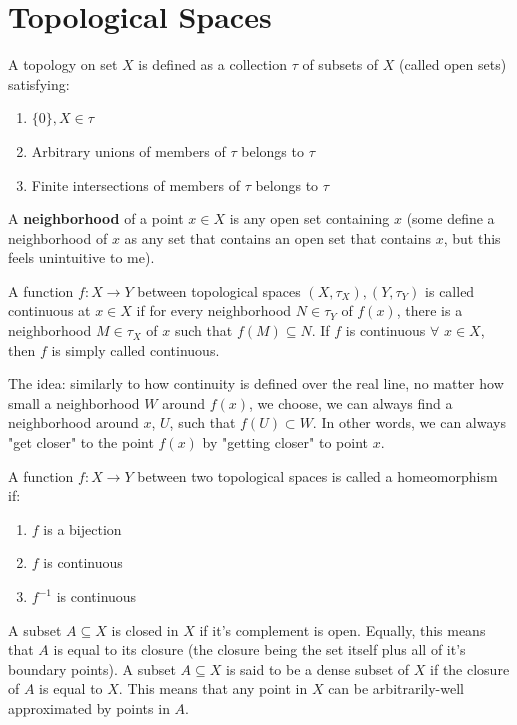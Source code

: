 \chapter{Topological Spaces}
\begin{definition}
	A topology on set $X$ is defined as a collection $\tau$ of subsets of $X$ (called open sets) satisfying:
	\begin{enumerate}
		\item $\{0\}, X\in \tau$
		\item Arbitrary unions of members of $\tau$ belongs to $\tau$
		\item Finite intersections of members of $\tau$ belongs to $\tau$
	\end{enumerate}
\end{definition}
A \textbf{neighborhood} of a point $x\in X$ is any open set containing $x$ (some define a neighborhood of $x$ as any set that contains an open set that contains $x$, but this feels unintuitive to me).
\begin{definition}
	A function $f: X\rightarrow Y$ between topological spaces $(X,\tau_X), (Y,\tau_Y)$ is called continuous at $x\in X$ if for every neighborhood $N\in \tau_Y$ of $f(x)$, there is a neighborhood $M\in \tau_X$ of $x$ such that $f(M)\subseteq N$. If $f$ is continuous $\forall$ $x\in X$, then $f$ is simply called continuous.
\end{definition}
The idea: similarly to how continuity is defined over the real line, no matter how small a neighborhood $W$ around $f(x)$, we choose, we can always find a neighborhood around $x$, $U$, such that $f(U) \subset W$. In other words, we can always "get closer" to the point $f(x)$ by "getting closer" to point $x$.
\begin{definition}[Homeomorphism]
	A function $f: X\rightarrow Y$ between two topological spaces is called a homeomorphism if:
	\begin{enumerate}
		\item $f$ is a bijection
		\item $f$ is continuous
		\item $f^{-1}$ is continuous
	\end{enumerate}
\end{definition}
A subset $A\subseteq X$ is closed in $X$ if it's complement is open. Equally, this means that $A$ is equal to its closure (the closure being the set itself plus all of it's boundary points). A subset $A\subseteq X$ is said to be a dense subset of $X$ if the closure of $A$ is equal to $X$. This means that any point in $X$ can be arbitrarily-well approximated by points in $A$.
